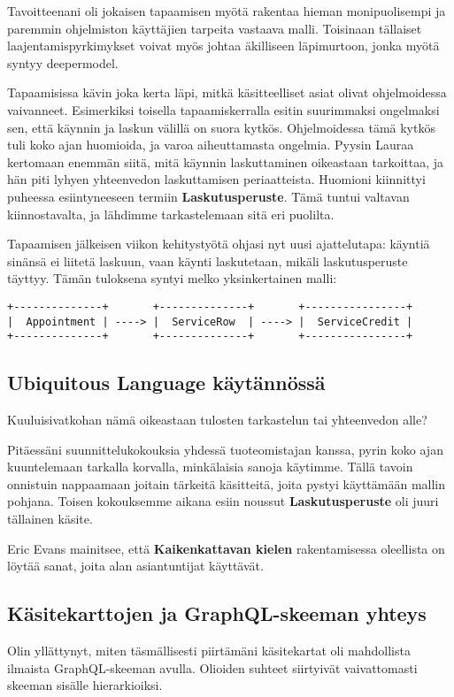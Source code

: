 Tavoitteenani oli jokaisen tapaamisen myötä rakentaa hieman
monipuolisempi ja paremmin ohjelmiston käyttäjien tarpeita vastaava
malli. Toisinaan tällaiset laajentamispyrkimykset voivat myös johtaa
äkilliseen läpimurtoon, jonka myötä syntyy
\gls{deepermodel}.\cite{evans:ddd}

Tapaamisissa kävin joka kerta läpi, mitkä käsitteelliset asiat olivat
ohjelmoidessa vaivanneet. Esimerkiksi toisella tapaamiskerralla esitin
suurimmaksi ongelmaksi sen, että käynnin ja laskun välillä on suora
kytkös. Ohjelmoidessa tämä kytkös tuli koko ajan huomioida, ja varoa
aiheuttamasta ongelmia. Pyysin Lauraa kertomaan enemmän siitä, mitä
käynnin laskuttaminen oikeastaan tarkoittaa, ja hän piti lyhyen
yhteenvedon laskuttamisen periaatteista. Huomioni kiinnittyi puheessa
esiintyneeseen termiin \textbf{Laskutusperuste}. Tämä tuntui valtavan
kiinnostavalta, ja lähdimme tarkastelemaan sitä eri puolilta.

Tapaamisen jälkeisen viikon kehitystyötä ohjasi nyt uusi ajattelutapa:
käyntiä sinänsä ei liitetä laskuun, vaan käynti laskutetaan, mikäli
laskutusperuste täyttyy. Tämän tuloksena syntyi melko yksinkertainen
malli:

\begin{verbatim}
+--------------+       +--------------+       +----------------+
|  Appointment | ----> |  ServiceRow  | ----> |  ServiceCredit |
+--------------+       +--------------+       +----------------+
\end{verbatim}

\hypertarget{ubiquitous-language-kuxe4ytuxe4nnuxf6ssuxe4}{%
\subsection{Ubiquitous Language
käytännössä}\label{ubiquitous-language-kuxe4ytuxe4nnuxf6ssuxe4}}

Kuuluisivatkohan nämä oikeastaan tulosten tarkastelun tai yhteenvedon
alle?

Pitäessäni suunnittelukokouksia yhdessä tuoteomistajan kanssa, pyrin
koko ajan kuuntelemaan tarkalla korvalla, minkälaisia sanoja käytimme.
Tällä tavoin onnistuin nappaamaan joitain tärkeitä käsitteitä, joita
pystyi käyttämään mallin pohjana. Toisen kokouksemme aikana esiin
noussut \textbf{Laskutusperuste} oli juuri tällainen käsite.

Eric Evans mainitsee, että \textbf{Kaikenkattavan kielen} rakentamisessa
oleellista on löytää sanat, joita alan asiantuntijat käyttävät.

\hypertarget{kuxe4sitekarttojen-ja-graphql-skeeman-yhteys}{%
\subsection{Käsitekarttojen ja GraphQL-skeeman
yhteys}\label{kuxe4sitekarttojen-ja-graphql-skeeman-yhteys}}

Olin yllättynyt, miten täsmällisesti piirtämäni käsitekartat oli
mahdollista ilmaista GraphQL-skeeman avulla. Olioiden suhteet siirtyivät
vaivattomasti skeeman sisälle hierarkioiksi.
